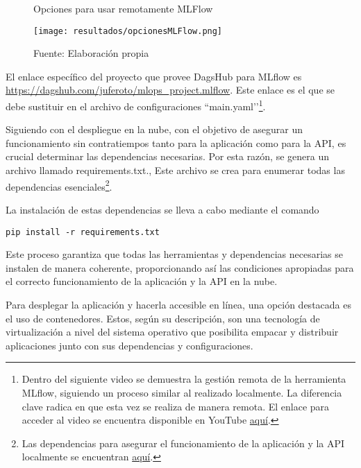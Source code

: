 \newpage

\begin{figure}[h]
	\centering
	\caption{Opciones para usar remotamente MLFlow}
	\texttt{[image: resultados/opcionesMLFlow.png]}
	\caption*{\footnotesize Fuente: Elaboración propia}
	\label{fig:figuraOpcionesMLFlow}
\end{figure}

El enlace específico del proyecto que provee DagsHub para MLflow es \\ \href{https://dagshub.com/juferoto/mlops_project.mlflow}{https://dagshub.com/juferoto/mlops\_project.mlflow}. Este enlace es el que se debe sustituir en el archivo de  configuraciones ``main.yaml’’\footnote{Dentro del siguiente video se demuestra la gestión remota de la herramienta MLflow, siguiendo un proceso similar al realizado localmente. La diferencia clave radica en que esta vez se realiza de manera remota. El enlace para acceder al video se encuentra disponible en YouTube \href{https://youtu.be/U2DqNOixHWw?si=OrJcIFpGiqfodAQy}{aquí}.}.

Siguiendo con el despliegue en la nube, con el objetivo de asegurar un funcionamiento sin contratiempos tanto para la aplicación como para la API, es crucial determinar las dependencias necesarias. Por esta razón, se genera un archivo llamado requirements.txt., Este archivo se crea para enumerar todas las dependencias esenciales\footnote{Las dependencias para asegurar el funcionamiento de la aplicación y la API localmente se encuentran \href{https://github.com/juferoto/mlops_project/blob/master/requirements.txt}{aquí}.}. 

La instalación de estas dependencias se lleva a cabo mediante el comando 
\begin{verbatim}
pip install -r requirements.txt
\end{verbatim}

\newpage

Este proceso garantiza que todas las herramientas y dependencias necesarias se instalen de manera coherente, proporcionando así las condiciones apropiadas para el correcto funcionamiento de la aplicación y la API en la nube.

Para desplegar la aplicación y hacerla accesible en línea, una opción destacada es el uso de contenedores. Estos, según su descripción, son una tecnología de virtualización a nivel del sistema operativo que posibilita empacar y distribuir aplicaciones junto con sus dependencias y configuraciones.

